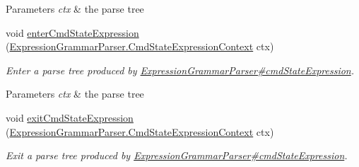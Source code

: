 \begin{DoxyCompactItemize}
\begin{DoxyCompactList}
\begin{DoxyParams}{Parameters}
{\em ctx} & the parse tree\\
\hline
\end{DoxyParams}
 \end{DoxyCompactList}\item 
void \hyperlink{classgov_1_1nasa_1_1jpf_1_1inspector_1_1server_1_1expression_1_1parser_1_1_expression_grammar_base_listener_a86fd066314b646242fe7d0324c2b9d2e}{enter\+Cmd\+State\+Expression} (\hyperlink{classgov_1_1nasa_1_1jpf_1_1inspector_1_1server_1_1expression_1_1parser_1_1_expression_grammar_pa37db371aaa956234112b7f14e4ab3f14}{Expression\+Grammar\+Parser.\+Cmd\+State\+Expression\+Context} ctx)
\begin{DoxyCompactList}\small\item\em Enter a parse tree produced by \hyperlink{classgov_1_1nasa_1_1jpf_1_1inspector_1_1server_1_1expression_1_1parser_1_1_expression_grammar_parser_a01e4723731d7e4c98df739e03c7c7f37}{Expression\+Grammar\+Parser\#cmd\+State\+Expression}.


\begin{DoxyParams}{Parameters}
{\em ctx} & the parse tree\\
\hline
\end{DoxyParams}
 \end{DoxyCompactList}\item 
void \hyperlink{classgov_1_1nasa_1_1jpf_1_1inspector_1_1server_1_1expression_1_1parser_1_1_expression_grammar_base_listener_afee36f8a8ecee8e057d162034c686cec}{exit\+Cmd\+State\+Expression} (\hyperlink{classgov_1_1nasa_1_1jpf_1_1inspector_1_1server_1_1expression_1_1parser_1_1_expression_grammar_pa37db371aaa956234112b7f14e4ab3f14}{Expression\+Grammar\+Parser.\+Cmd\+State\+Expression\+Context} ctx)
\begin{DoxyCompactList}\small\item\em Exit a parse tree produced by \hyperlink{classgov_1_1nasa_1_1jpf_1_1inspector_1_1server_1_1expression_1_1parser_1_1_expression_grammar_parser_a01e4723731d7e4c98df739e03c7c7f37}{Expression\+Grammar\+Parser\#cmd\+State\+Expression}.



\end{DoxyCompactList}
\end{DoxyCompactItemize}
